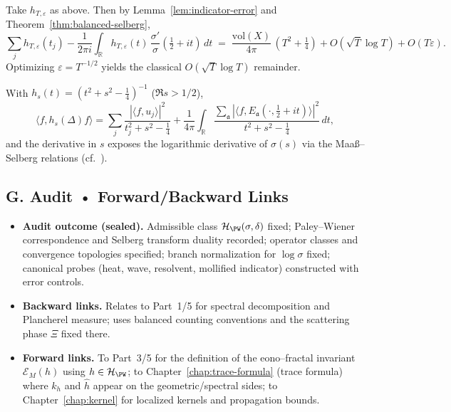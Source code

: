 \begin{example}
Take $h_{T,\varepsilon}$ as above. Then by Lemma~\ref{lem:indicator-error} and Theorem~\ref{thm:balanced-selberg},
\[
  \sum_j h_{T,\varepsilon}(t_j) - \frac{1}{2\pi i}\!\int_{\mathbb R} h_{T,\varepsilon}(t)\,\frac{\sigma'}{\sigma}(\tfrac12+it)\,dt
  \;=\; \frac{\mathrm{vol}(X)}{4\pi}\,(T^2+\tfrac14) + O(\sqrt{T}\log T) + O(T\varepsilon).
\]
Optimizing $\varepsilon=T^{-1/2}$ yields the classical $O(\sqrt{T}\log T)$ remainder.
\end{example}

\begin{example}
With $h_s(t)=(t^2+s^2-\tfrac14)^{-1}$ ($\Re s>1/2$),
\[
  \langle f, h_s(\Delta) f\rangle
  = \sum_j \frac{|\langle f,u_j\rangle|^2}{t_j^2+s^2-\tfrac14}
  + \frac{1}{4\pi}\int_{\mathbb R}\frac{\sum_{\mathfrak a}|\langle f,E_{\mathfrak a}(\cdot,\tfrac12+it)\rangle|^2}{t^2+s^2-\tfrac14}\,dt,
\]
and the derivative in $s$ exposes the logarithmic derivative of $\sigma(s)$ via the Maaß–Selberg relations (cf.\ \cite{LaxPhillips1976,Hejhal1983II}).
\end{example}


\subsection*{G. Audit • Forward/Backward Links}
\label{subsec:audit-test}

\begin{itemize}
  \item \textbf{Audit outcome (sealed).}
  Admissible class $\mathcal H_{\PW}(\sigma,\delta)$ fixed; Paley–Wiener correspondence and Selberg transform duality recorded; operator classes and convergence topologies specified; branch normalization for $\log\sigma$ fixed; canonical probes (heat, wave, resolvent, mollified indicator) constructed with error controls.
  \item \textbf{Backward links.}
  Relates to Part~1/5  for spectral decomposition and Plancherel measure; uses balanced counting conventions and the scattering phase $\Xi$ fixed there.
  \item \textbf{Forward links.}
  To Part~3/5  for the definition of the eono–fractal invariant $\mathcal E_M(h)$ using $h\in\mathcal H_{\PW}$; to Chapter~\ref{chap:trace-formula} (trace formula) where $k_h$ and $\hat h$ appear on the geometric/spectral sides; to Chapter~\ref{chap:kernel} for localized kernels and propagation bounds.
\end{itemize}


